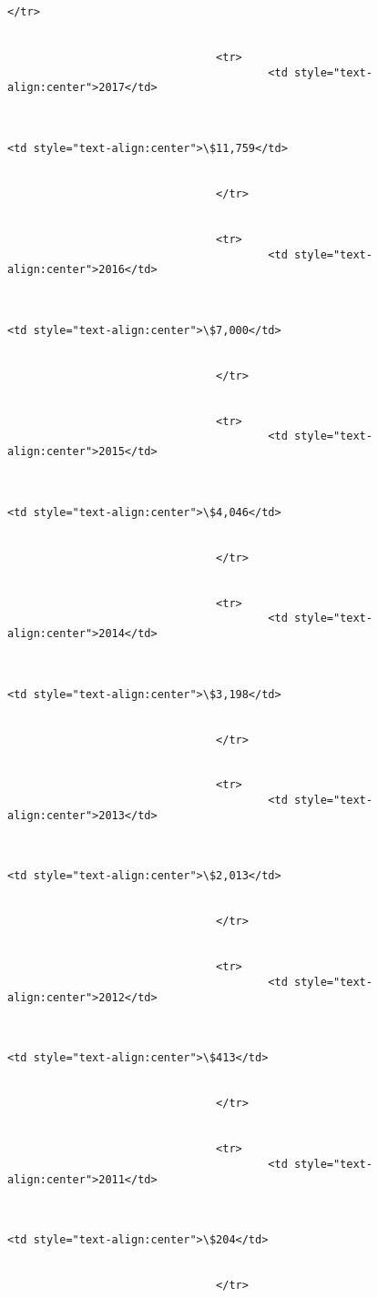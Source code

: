 \documentclass[11pt]{article}
\begin{document}
\begin{Verbatim}[commandchars=\\\{\}]
                                </tr>


                                <tr>
                                        <td style="text-align:center">2017</td>



<td style="text-align:center">\$11,759</td>


                                </tr>


                                <tr>
                                        <td style="text-align:center">2016</td>



<td style="text-align:center">\$7,000</td>


                                </tr>


                                <tr>
                                        <td style="text-align:center">2015</td>



<td style="text-align:center">\$4,046</td>


                                </tr>


                                <tr>
                                        <td style="text-align:center">2014</td>



<td style="text-align:center">\$3,198</td>


                                </tr>


                                <tr>
                                        <td style="text-align:center">2013</td>



<td style="text-align:center">\$2,013</td>


                                </tr>


                                <tr>
                                        <td style="text-align:center">2012</td>



<td style="text-align:center">\$413</td>


                                </tr>


                                <tr>
                                        <td style="text-align:center">2011</td>



<td style="text-align:center">\$204</td>


                                </tr>



\end{Verbatim}
\end{document}
